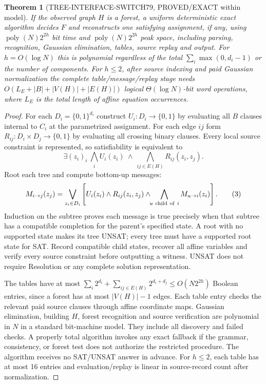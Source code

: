 \documentclass[11pt]{article}
\newtheorem{theorem}{Theorem}
\begin{document}
\begin{theorem}[TREE-INTERFACE-SWITCH79, PROVED/EXACT within model]
If the observed graph $H$ is a forest, a uniform deterministic exact
algorithm decides $F$ and reconstructs one satisfying assignment,
if any, using $\operatorname{poly}(N)2^{2h}$ bit time and
$\operatorname{poly}(N)2^{2h}$ peak space, including parsing,
recognition, Gaussian elimination, tables, source replay and output.
For $h=O(\log N)$ this is polynomial regardless of the total
$\sum_i\max(0,d_i-1)$ or the number of components.
For $h\le2$, after source indexing and paid Gaussian normalization
the complete table/message/replay stage needs
$O(L_E+|B|+|V(H)|+|E(H)|)$ logical
$\Theta(\log N)$-bit word operations, where $L_E$ is the total
length of affine equation occurrences.
\end{theorem}
\begin{proof}
For each $D_i=\{0,1\}^{d_i}$ construct $U_i:D_i\to\{0,1\}$
by evaluating all $B$ clauses internal to $C_i$ at the
parametrized assignment. For each edge $ij$ form
$R_{ij}:D_i\times D_j\to\{0,1\}$ by evaluating all crossing
binary clauses. Every local source constraint is represented,
so satisfiability is equivalent to
\[
\exists(z_i)_i\ 
\bigwedge_i U_i(z_i)\ \land\
\bigwedge_{ij\in E(H)}R_{ij}(z_i,z_j).
\tag{2}
\]
Root each tree and compute bottom-up messages:
\[
M_{i\to j}(z_j)=
\bigvee_{z_i\in D_i}
\left[U_i(z_i)\land R_{ij}(z_i,z_j)
\land\!\!\bigwedge_{u\ {\rm child\ of}\ i}M_{u\to i}(z_i)\right].
\tag{3}
\]
Induction on the subtree proves each message is true precisely
when that subtree has a compatible completion for the parent's
specified state. A root with no supported state makes its tree
UNSAT; every tree must have a supported root state for SAT.
Record compatible child states, recover all affine variables
and verify every source constraint before outputting a witness.
UNSAT does not require Resolution or any complete solution
representation.

The tables have at most
$\sum_i2^{d_i}+\sum_{ij\in E(H)}2^{d_i+d_j}
\le O(N2^{2h})$ Boolean entries, since a forest has at most
$|V(H)|-1$ edges. Each table entry checks the relevant paid
source clauses through affine coordinate maps. Gaussian
elimination, building $H$, forest recognition and source
verification are polynomial in $N$ in a standard bit-machine
model. They include all discovery and failed checks. A
properly total algorithm invokes any exact fallback if the
grammar, consistency, or forest test does not authorize the
restricted procedure. The algorithm receives no SAT/UNSAT
answer in advance. For $h\le2$, each table has at most 16
entries and evaluation/replay is linear in source-record count
after normalization.
\end{proof}
\end{document}
